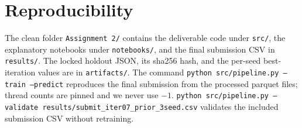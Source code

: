 \documentclass[a4paper,10pt]{article}
\begin{document}
\section*{Reproducibility}

The clean folder \texttt{Assignment~2/} contains the deliverable
code under \texttt{src/}, the explanatory notebooks under
\texttt{notebooks/}, and the final submission CSV in
\texttt{results/}. The locked holdout JSON, its sha256 hash, and
the per-seed best-iteration values are in \texttt{artifacts/}. The
command \texttt{python src/pipeline.py --train --predict}
reproduces the final submission from the processed parquet files;
thread counts are pinned and we never use $-1$.
\texttt{python src/pipeline.py --validate
results/submit\_iter07\_prior\_3seed.csv} validates the included
submission CSV without retraining.
\end{document}
